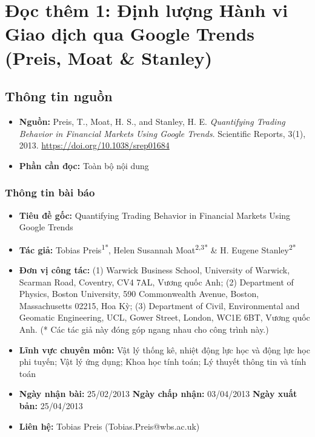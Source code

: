 \chapter{Đọc thêm 1: Định lượng Hành vi Giao dịch qua Google Trends (Preis, Moat \& Stanley)}
\label{ch:M4L2DT1}


\section{Thông tin nguồn}

\begin{itemize}
  \item \textbf{Nguồn:} Preis, T., Moat, H. S., and Stanley, H. E. \emph{Quantifying Trading Behavior in Financial Markets Using Google Trends}. Scientific Reports, 3(1), 2013. \url{https://doi.org/10.1038/srep01684}
  \item \textbf{Phần cần đọc:} Toàn bộ nội dung
\end{itemize}

\subsection*{Thông tin bài báo}

\begin{itemize}
  \item \textbf{Tiêu đề gốc:} Quantifying Trading Behavior in Financial Markets Using Google Trends
  \item \textbf{Tác giả:} Tobias Preis\textsuperscript{1*}, Helen Susannah Moat\textsuperscript{2,3*} \& H. Eugene Stanley\textsuperscript{2*}
  \item \textbf{Đơn vị công tác:} (1) Warwick Business School, University of Warwick, Scarman Road, Coventry, CV4 7AL, Vương quốc Anh; (2) Department of Physics, Boston University, 590 Commonwealth Avenue, Boston, Massachusetts 02215, Hoa Kỳ; (3) Department of Civil, Environmental and Geomatic Engineering, UCL, Gower Street, London, WC1E 6BT, Vương quốc Anh. (* Các tác giả này đóng góp ngang nhau cho công trình này.)
  \item \textbf{Lĩnh vực chuyên môn:} Vật lý thống kê, nhiệt động lực học và động lực học phi tuyến; Vật lý ứng dụng; Khoa học tính toán; Lý thuyết thông tin và tính toán
  \item \textbf{Ngày nhận bài:} 25/02/2013 \quad \textbf{Ngày chấp nhận:} 03/04/2013 \quad \textbf{Ngày xuất bản:} 25/04/2013
  \item \textbf{Liên hệ:} Tobias Preis (Tobias.Preis@wbs.ac.uk)
\end{itemize}

